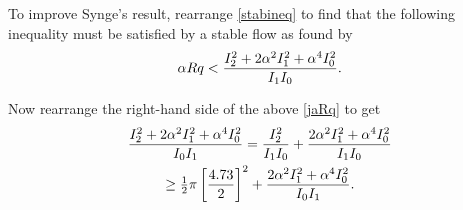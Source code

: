 


To improve Synge's result, rearrange \eqref{stabineq} to find that the following inequality must be satisfied by a stable flow as found by \citet{joseph1968eigenvalue}
\begin{equation}
    \alpha R q < \frac{I^2_{2} + 2 \alpha^2 I^2_{1} + \alpha^4 I^2_{0}}{I_1 I_0}.
\label{jaRq}
\end{equation}

Now rearrange the right-hand side of the above \eqref{jaRq} to get
\begin{gather}
    \frac{I^2_{2} + 2 \alpha^2 I^2_{1} + \alpha^4 I^2_{0}}{I_0 I_1} = \frac{I^2_{2}}{I_1 I_0} + \frac{2 \alpha^2 I^2_{1} + \alpha^4 I^2_{0}}{I_1 I_0} \nonumber\\
    \geq \tfrac{1}{2} \pi \left[\frac{4.73}{2}\right]^2 + \frac{2 \alpha^2 I^2_{1} + \alpha^4 I^2_{0}}{I_0 I_1}.
\end{gather}

